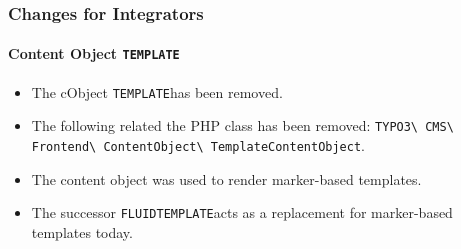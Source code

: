 %

\begin{frame}[fragile]
	\frametitle{Changes for Integrators}
	\framesubtitle{Content Object \small\texttt{TEMPLATE}\normalsize}


	\begin{itemize}
		\item The cObject \small\texttt{TEMPLATE}\normalsize has been removed.
		\item The following related the PHP class has been removed:\newline
			\texttt{TYPO3\textbackslash
				CMS\textbackslash
				Frontend\textbackslash
				ContentObject\textbackslash
				TemplateContentObject}.
		\item The content object was used to render marker-based templates.
		\item The successor \small\texttt{FLUIDTEMPLATE}\normalsize acts as a
			replacement for marker-based templates today.
	\end{itemize}
\end{frame}


